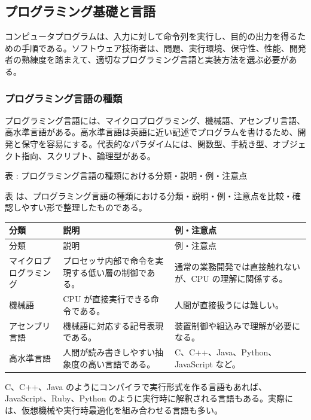 \subsection{プログラミング基礎と言語}

コンピュータプログラムは、入力に対して命令列を実行し、目的の出力を得るための手順である。ソフトウェア技術者は、問題、実行環境、保守性、性能、開発者の熟練度を踏まえて、適切なプログラミング言語と実装方法を選ぶ必要がある。

\subsubsection{プログラミング言語の種類}

プログラミング言語には、マイクロプログラミング、機械語、アセンブリ言語、高水準言語がある。高水準言語は英語に近い記述でプログラムを書けるため、開発と保守を容易にする。代表的なパラダイムには、関数型、手続き型、オブジェクト指向、スクリプト、論理型がある。

\par\smallskip\noindent{}\label{tab:ch16-11}表 \thetable: プログラミング言語の種類における分類・説明・例・注意点\par\smallskip
表 \thetable は、プログラミング言語の種類における分類・説明・例・注意点を比較・確認しやすい形で整理したものである。\par\smallskip
\begin{longtable}{>{\raggedright\arraybackslash}p{}>{\raggedright\arraybackslash}p{}>{\raggedright\arraybackslash}p{}}
\toprule
分類 & 説明 & 例・注意点 \\
\midrule
\endfirsthead
\toprule
分類 & 説明 & 例・注意点 \\
\midrule
\endhead
マイクロプログラミング & プロセッサ内部で命令を実現する低い層の制御である。 & 通常の業務開発では直接触れないが、CPU の理解に関係する。 \\
機械語 & CPU が直接実行できる命令である。 & 人間が直接扱うには難しい。 \\
アセンブリ言語 & 機械語に対応する記号表現である。 & 装置制御や組込みで理解が必要になる。 \\
高水準言語 & 人間が読み書きしやすい抽象度の高い言語である。 & C、C++、Java、Python、JavaScript など。 \\
\bottomrule
\end{longtable}

C、C++、Java のようにコンパイラで実行形式を作る言語もあれば、JavaScript、Ruby、Python のように実行時に解釈される言語もある。実際には、仮想機械や実行時最適化を組み合わせる言語も多い。

